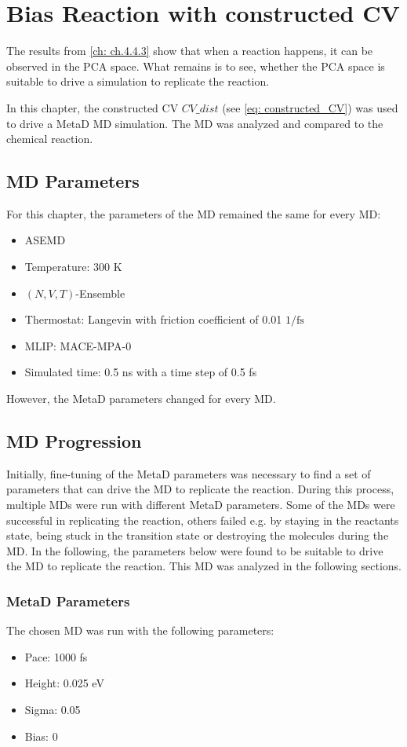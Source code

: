 \chapter{Bias Reaction with constructed CV}\label{ch: ch5}%

The results from \cref{ch: ch.4.4.3} show that when a reaction happens, it can be observed in the PCA space.  
What remains is to see, whether the PCA space is suitable to drive a simulation to replicate the reaction. 

In this chapter, the constructed CV $CV\_dist$ (see \ref{eq: constructed_CV}) was used to drive a MetaD MD simulation.
The MD was analyzed and compared to the chemical reaction.

\section{MD Parameters}
For this chapter, the parameters of the MD remained the same for every MD:

\begin{itemize}
    \item ASEMD
    \item Temperature: 300 K
    \item $(N,V,T)$-Ensemble
    \item Thermostat: Langevin with friction coefficient of 0.01 $1/{\text{fs}}$
    \item MLIP: MACE-MPA-0
    \item Simulated time: 0.5 ns with a time step of 0.5 fs
\end{itemize}

However, the MetaD parameters changed for every MD.

\section{MD Progression} \label{ch: ch.5.2}
Initially, fine-tuning of the MetaD parameters was necessary to find a set of parameters that can drive the MD to replicate the reaction.
During this process, multiple MDs were run with different MetaD parameters.
Some of the MDs were successful in replicating the reaction, others failed e.g. by staying in the reactants state, being stuck in the transition state or destroying the molecules during the MD.
In the following, the parameters below were found to be suitable to drive the MD to replicate the reaction.
This MD was analyzed in the following sections.

\subsection{MetaD Parameters} 
The chosen MD was run with the following parameters:
\begin{itemize}
    \item Pace: 1000 fs 
    \item Height: 0.025 eV
    \item Sigma: 0.05
    \item Bias: 0
\end{itemize}

